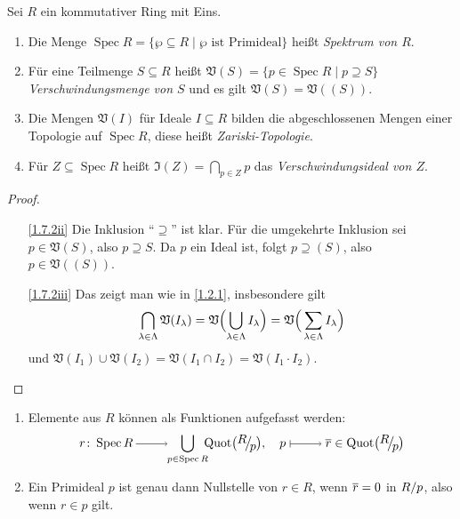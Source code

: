 \documentclass[a4paper,12pt]{scrbook}
\theoremstyle{keinenummern} %
\theoremstyle{mitnummern}
\theoremstyle{unserbeweis}
\newtheorem{proof}{Beweis}
\def\V{\mathfrak{V}}
\def\I{\mathfrak{I}}
\newcommand{\Spec}{\operatorname{Spec}}
\newcommand{\Quot}{\operatorname{Quot}}
\newcommand{\ra}{\raisebox{-1pt}{\tikz{\draw[thin,shorten >=3pt, ->] (0,0) node{\hspace*{-2pt}} -- node{} (1,0);}}\penalty1000\relax}
\renewcommand{\mapsto}{\raisebox{-1pt}{\tikz{\draw[thin,shorten >=3pt, |->] (0,0) node{\hspace*{0pt}} -- node{} (1,0);}}\penalty1000\relax}
\def\Bar#1{\ensuremath\overline{#1}}
\newcommand{\Quotient}[2]{
  \mathchoice
  { %
    \raisebox{0.7ex}{\ensuremath{#1}}
    \ensuremath{\mkern-3mu}\big/\ensuremath{\mkern-3mu}
    \raisebox{-0.6ex}{\ensuremath{#2}}
  }
  { %
    #1/#2
  }
  { %
    #1/#2
  }
  { %
    #1/#2
  }
}
\begin{document}
\begin{db}\label{1.7.2}
  Sei $R$ ein kommutativer Ring mit Eins.
  \begin{enumerate}
  \item{} Die Menge $\Spec R = \{\wp\subseteq R \mid \wp\text{ ist Primideal}\}$ heißt \emph{Spektrum von $R$}.
  \item{} Für eine Teilmenge $S\subseteq R$ heißt $\V(S) = \{p\in\Spec R \mid p\supseteq S\}$
    \emph{Verschwindungsmenge von $S$} und es gilt $\V(S)=\V((S))$.
  \item{} Die Mengen $\V(I)$ für Ideale $I\subseteq R$ bilden die abgeschlossenen Mengen einer Topologie auf
    $\Spec R$, diese heißt \emph{Zariski-Topologie}.
  \item{} Für $Z\subseteq\Spec R$ heißt $\I(Z)=\displaystyle\bigcap_{p\in Z}p$ das \emph{Verschwindungsideal von
      $Z$}.
  \end{enumerate}
\end{db}
\begin{proof}
  \begin{enumerate}
  \item[\ref{1.7.2ii}] Die Inklusion \enquote{$\supseteq$} ist klar. Für die umgekehrte Inklusion sei $p\in\V(S)$, also
    $p\supseteq S$. Da $p$ ein Ideal ist, folgt $p\supseteq (S)$, also $p\in\V((S))$.
  \item[\ref{1.7.2iii}] Das zeigt man wie in \cref{1.2.1}, insbesondere gilt
    \[\displaystyle\bigcap_{\lambda\in\Lambda}\V(I_\lambda) =
    \V\Bigl(\bigcup_{\lambda\in\Lambda}I_\lambda\Bigr)=\V\Bigr(\sum_{\lambda\in\Lambda}I_\lambda\Bigr)\] und
    $\V(I_1)\cup\V(I_2)=\V(I_1\cap I_2)=\V(I_1\cdot I_2)$.
  \end{enumerate}
\end{proof}

\begin{db}\label{1.7.3}
  \begin{enumerate}
  \item{} Elemente aus $R$ können als Funktionen aufgefasst werden:
    \[ r\colon \Spec R \ra \!\!\!\bigcup_{p\in\Spec R}\!\!\! \Quot\bigl(\Quotient{R}{p}\bigr),\quad
    p\mapsto\Bar{r}\in\Quot\bigl(\Quotient{R}{p}\bigr) \]
  \item{} Ein Primideal $p$ ist genau dann Nullstelle von $r\in R$, wenn $\Bar{r}=0$ in $\Quotient{R}{p}$, also wenn
    $r\in p$ gilt.
  \end{enumerate}
\end{db}
\end{document}

